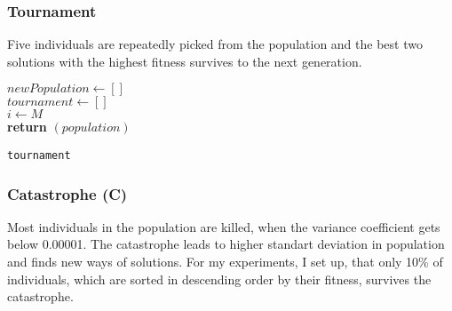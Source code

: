 \documentclass{article}
\begin{document}
		\subsubsection{Tournament}
		Five individuals are repeatedly picked from the population and the best two solutions with the highest fitness survives to the next generation.
		\begin{center}
			\begin{minipage}{1\linewidth} %
				\begin{algorithm}[H]
					\hrulefill
					\medskip

					$newPopulation \gets []$\\
					$tournament \gets []$\\
					$i \gets M$\\
					{\bf return} $(population)$
					\caption{\texttt{tournament}} %
					\label{alg:tournament}   %
				\end{algorithm}
			\end{minipage}
		\end{center}

		\subsubsection{Catastrophe (C)}
		Most individuals in the population are killed, when the variance coefficient gets below 0.00001. The catastrophe leads to higher standart deviation in population and finds new ways of solutions. For my experiments, I set up, that only 10\% of individuals, which are sorted in descending order by their fitness, survives the catastrophe.
\end{document}

